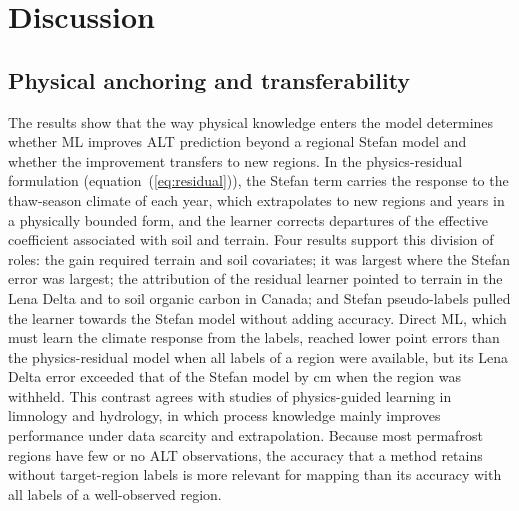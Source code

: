 \section{Discussion}\label{sec:discussion}

\subsection{Physical anchoring and transferability}
The results show that the way physical knowledge enters the model determines whether ML improves ALT prediction beyond a regional Stefan model and whether the improvement transfers to new regions. In the physics-residual formulation (equation~(\ref{eq:residual})), the Stefan term carries the response to the thaw-season climate of each year, which extrapolates to new regions and years in a physically bounded form, and the learner corrects departures of the effective coefficient associated with soil and terrain. Four results support this division of roles: the gain required terrain and soil covariates; it was largest where the Stefan error was largest; the attribution of the residual learner pointed to terrain in the Lena Delta and to soil organic carbon in Canada; and Stefan pseudo-labels pulled the learner towards the Stefan model without adding accuracy. Direct ML, which must learn the climate response from the labels, reached lower point errors than the physics-residual model when all labels of a region were available, but its Lena Delta error exceeded that of the Stefan model by \ndrefLeregDzabs{} cm when the region was withheld. This contrast agrees with studies of physics-guided learning in limnology and hydrology, in which process knowledge mainly improves performance under data scarcity and extrapolation\cite{Read2019,Jia2021,Willard2022}. Because most permafrost regions have few or no ALT observations, the accuracy that a method retains without target-region labels is more relevant for mapping than its accuracy with all labels of a well-observed region.

